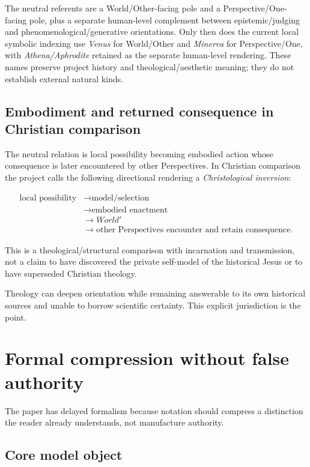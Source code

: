 \documentclass[11pt]{article}
\begin{document}
The neutral referents are a World/Other-facing pole and a Perspective/One-facing pole, plus a separate human-level complement between epistemic/judging and phenomenological/generative orientations. Only then does the current local symbolic indexing use \emph{Venus} for World/Other and \emph{Minerva} for Perspective/One, with \emph{Athena/Aphrodite} retained as the separate human-level rendering. These names preserve project history and theological/aesthetic meaning; they do not establish external natural kinds.

\subsection{Embodiment and returned consequence in Christian comparison}

The neutral relation is local possibility becoming embodied action whose consequence is later encountered by other Perspectives. In Christian comparison the project calls the following directional rendering a \emph{Christological inversion}:

\begin{equation}
\begin{aligned}
\text{local possibility}&\rightarrow\text{model/selection}\\
&\rightarrow\text{embodied enactment}\\
&\rightarrow World'\\
&\rightarrow\text{other Perspectives encounter and retain consequence}.
\end{aligned}
\end{equation}

This is a theological/structural comparison with incarnation and transmission, not a claim to have discovered the private self-model of the historical Jesus or to have superseded Christian theology.

Theology can deepen orientation while remaining answerable to its own historical sources and unable to borrow scientific certainty. This explicit jurisdiction is the point.

\section{Formal compression without false authority}

The paper has delayed formalism because notation should compress a distinction the reader already understands, not manufacture authority.

\subsection{Core model object}
\end{document}

